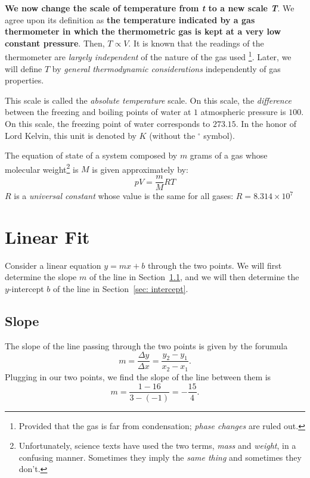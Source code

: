 \documentclass[11pt]{article}         %
\begin{document}
\textbf{We now change the scale of temperature from \emph{t} to a new scale \emph{T}}. We agree upon its definition as \textbf{the temperature indicated by a gas thermometer in which the thermometric gas is kept at a very low constant pressure}. Then, $T\propto V$. It is known that the readings of the thermometer are \emph{largely independent} of the nature of the gas used \footnote{Provided that the gas is far from condensation; \emph{phase changes} are ruled out.}. Later,  we will define $T$ by \emph{general thermodynamic considerations} independently of gas properties.

This scale is called the \emph{absolute temperature} scale. On this scale, the \emph{difference} between the freezing and boiling points of water at $1$ atmospheric pressure is $100$. On this scale, the freezing point of water corresponds to $273.15$. In the honor of Lord Kelvin, this unit is denoted by $K$ (without the $^\circ$ symbol).

The equation of state of a system composed by $m$ grams of a gas whose molecular weight\footnote{Unfortunately, science texts have used the two terms, \emph{mass} and \emph{weight}, in a confusing manner. Sometimes they imply the \emph{same thing} and sometimes they don't.} is $M$ is given approximately by:
\begin{equation}
    \label{sec: gas-equation}
    pV = \frac{m}{M}RT
\end{equation}
$R$ is a \emph{universal constant} whose value is the same for all gases: $R=8.314\times 10^7$

\section{Linear Fit}
\label{sec: linear fit}
Consider a linear equation $y = m x + b$ through the two points.  We will
first determine the slope $m$ of the line in Section~\ref{sec: slope}, and we
will then determine the $y$-intercept $b$ of the line in Section~\ref{sec:
intercept}.

\subsection{Slope}
\label{sec: slope}

The slope of the line passing through the two points is given by the forumula
$$
	m 
	= \frac{\Delta y}{\Delta x} 
	= \frac{y_2 - y_1}{x_2 - x_1}
	.
$$
Plugging in our two points, we find the slope of the line between them is
\begin{equation}
\label{eqn: slope}
	m 
	= \frac{1 - 16}{3 - (-1)}
	= - \frac{15}{4}
	.
\end{equation}
\end{document}

